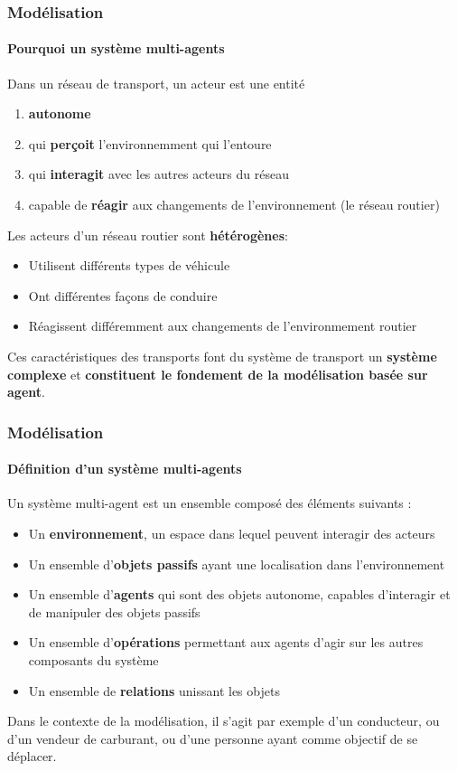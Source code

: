 \begin{frame}
    \frametitle{Modélisation}
    \framesubtitle{Pourquoi un système multi-agents}

    Dans un réseau de transport, un acteur est une entité
    \begin{enumerate}
        \item \textbf{autonome}
        \item qui \textbf{perçoit} l'environnemment qui l'entoure
        \item qui \textbf{interagit} avec les autres acteurs du réseau
        \item capable de \textbf{réagir} aux changements de l'environnement (le réseau routier)
    \end{enumerate}

    \pause{}
    Les acteurs d'un réseau routier sont \textbf{hétérogènes}:

    \begin{itemize}
        \item Utilisent différents types de véhicule
        \item Ont différentes façons de conduire
        \item Réagissent différemment aux changements de l'environmement routier
    \end{itemize}

    \pause{}
    Ces caractéristiques des transports font du système de transport un \textbf{système complexe} et \textbf{constituent le fondement de la modélisation basée sur agent}.
\end{frame}

\begin{frame}
    \frametitle{Modélisation}
    \framesubtitle{Définition d'un système multi-agents}
    Un système multi-agent est un ensemble composé des éléments suivants :
    \begin{itemize}
        \item Un \textbf{environnement}, un espace dans lequel peuvent interagir des acteurs
        \item Un ensemble d'\textbf{objets passifs} ayant une localisation dans l'environnement
        \item Un ensemble d'\textbf{agents} qui sont des objets autonome, capables d'interagir et de manipuler des objets passifs
        \item Un ensemble d'\textbf{opérations} permettant aux agents d'agir sur les autres composants du système
        \item Un ensemble de \textbf{relations} unissant les objets
    \end{itemize}

    \pause{}

    Dans le contexte de la modélisation, il s'agit par exemple d'un conducteur, ou d'un vendeur de carburant, ou d'une personne ayant comme objectif de se déplacer.
\end{frame}

